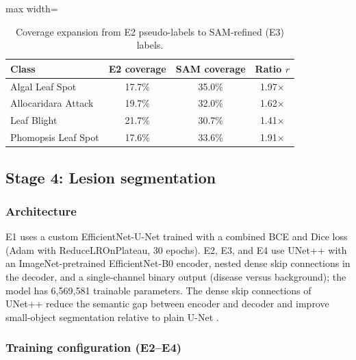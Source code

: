 \documentclass[final,5p,times,twocolumn,authoryear]{elsarticle}
\begin{document}
\begin{table}[!htbp]
\centering
\caption{Coverage expansion from E2 pseudo-labels to SAM-refined (E3) labels.}
\label{tab:sam_expansion}
\begin{adjustbox}{max width=\columnwidth}
\begin{tabular}{lccc}
\toprule
\textbf{Class} & \textbf{E2 coverage} & \textbf{SAM coverage} & \textbf{Ratio $r$} \\
\midrule
Algal Leaf Spot     & 17.7\% & 35.0\% & 1.97$\times$ \\
Allocaridara Attack & 19.7\% & 32.0\% & 1.62$\times$ \\
Leaf Blight         & 21.7\% & 30.7\% & 1.41$\times$ \\
Phomopsis Leaf Spot & 17.6\% & 33.6\% & 1.91$\times$ \\
\bottomrule
\end{tabular}
\end{adjustbox}
\end{table}

\subsection{Stage 4: Lesion segmentation}
\label{sec:seg_train}

\subsubsection{Architecture}

E1 uses a custom EfficientNet-U-Net trained with a combined BCE and Dice loss (Adam with ReduceLROnPlateau, 30 epochs). E2, E3, and E4 use UNet++ \citep{zhou2018unet++} with an ImageNet-pretrained EfficientNet-B0 encoder, nested dense skip connections in the decoder, and a single-channel binary output (disease versus background); the model has 6{,}569{,}581 trainable parameters. The dense skip connections of UNet++ reduce the semantic gap between encoder and decoder and improve small-object segmentation relative to plain U-Net \citep{ronneberger2015unet}.

\subsubsection{Training configuration (E2--E4)}
\end{document}
